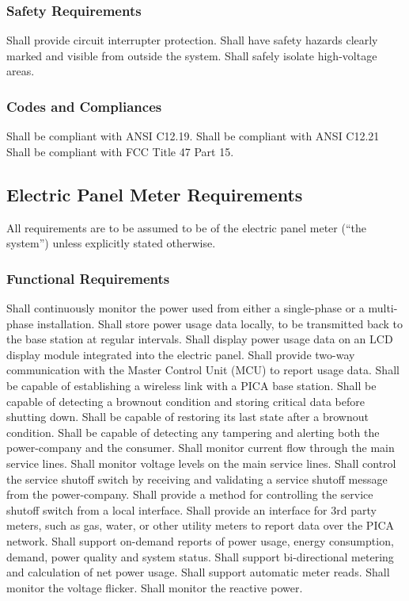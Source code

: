 \subsubsection{Safety Requirements}
\begin{outline}[enumerate]
\1 Shall provide circuit interrupter protection. 
\1 Shall have safety hazards clearly marked and visible from outside the system.
\1 Shall safely isolate high-voltage areas.
\end{outline}

\subsubsection{Codes and Compliances}
\begin{outline}[enumerate]
\1 Shall be compliant with ANSI C12.19.
\1 Shall be compliant with ANSI C12.21
\1 Shall be compliant with FCC Title 47 Part 15.
\end{outline}

\subsection{Electric Panel Meter Requirements}
All requirements are to be assumed to be of the electric panel meter (``the system'') unless explicitly stated otherwise.

\subsubsection{Functional Requirements}
\begin{outline}[enumerate]
\1 Shall continuously monitor the power used from either a single-phase or a multi-phase installation.
\1 Shall store power usage data locally, to be transmitted back to the base station at regular intervals.
\1 Shall display power usage data on an LCD display module integrated into the electric panel.
\1 Shall provide two-way communication with the Master Control Unit (MCU) to report usage data.
\1 Shall be capable of establishing a wireless link with a PICA base station.
\1 Shall be capable of detecting a brownout condition and storing critical data before shutting down.
\1 Shall be capable of restoring its last state after a brownout condition.
\1 Shall be capable of detecting any tampering and alerting both the power-company and the consumer.
\1 Shall monitor current flow through the main service lines.
\1 Shall monitor voltage levels on the main service lines.
\1 Shall control the service shutoff switch by receiving and validating a service shutoff message from the power-company.
\1 Shall provide a method for controlling the service shutoff switch from a local interface.
\1 Shall provide an interface for 3rd party meters, such as gas, water, or other utility meters to report data over the PICA network.
\1 Shall support on-demand reports of power usage, energy consumption, demand, power quality and system status.
\1 Shall support bi-directional metering and calculation of net power usage.
\1 Shall support automatic meter reads.
\1 Shall monitor the voltage flicker.
\1 Shall monitor the reactive power.
\end{outline}

